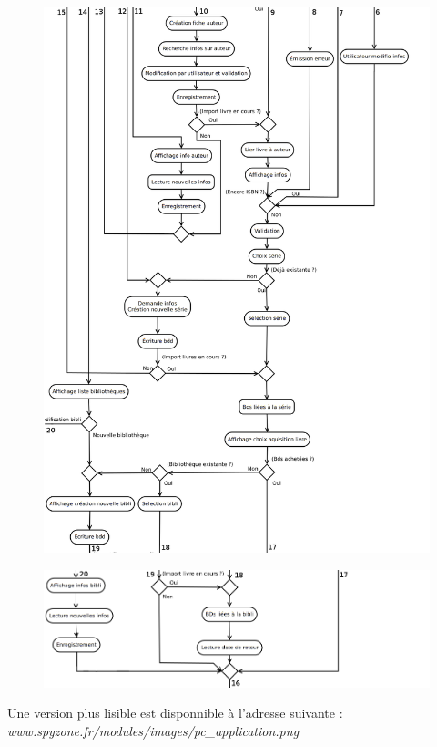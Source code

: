 \begin{figure}[h!]
\begin{center}
\includegraphics[width=16cm]{uml/appli_pc/p3.png}
\end{center}
\end{figure}
\newpage{}

\begin{figure}[t!]
\begin{center}
\includegraphics[width=16cm]{uml/appli_pc/p4.png}
\end{center}
\end{figure}

Une version plus lisible est disponnible à l'adresse suivante : 
\emph{www.spyzone.fr/modules/images/pc_application.png}

